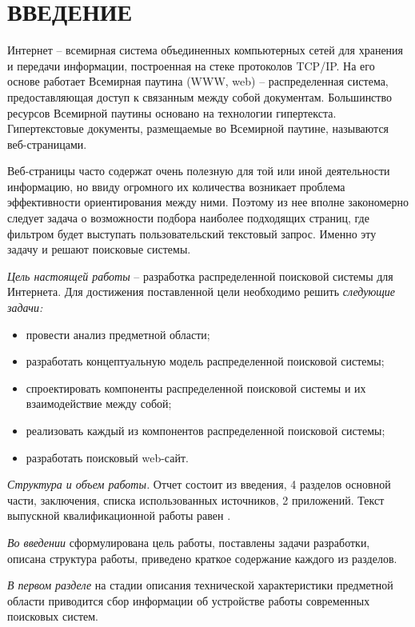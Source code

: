 \section*{ВВЕДЕНИЕ}

Интернет -- всемирная система объединенных компьютерных сетей для хранения и передачи информации, построенная на стеке протоколов TCP/IP. На его основе работает Всемирная паутина (WWW,  web) -- распределенная система, предоставляющая доступ к связанным между собой документам.  Большинство ресурсов Всемирной паутины основано на технологии гипертекста. Гипертекстовые документы, размещаемые во Всемирной паутине, называются веб-страницами.

Веб-страницы часто содержат очень полезную для той или иной деятельности информацию, но ввиду огромного их количества возникает проблема эффективности ориентирования между ними. Поэтому из нее вполне закономерно следует задача о возможности подбора наиболее подходящих страниц, где фильтром будет выступать пользовательский текстовый запрос. Именно эту задачу и решают поисковые системы.

\emph{Цель настоящей работы} – разработка распределенной поисковой системы для Интернета. Для достижения поставленной цели необходимо решить \emph{следующие задачи:}
\begin{itemize}
\item провести анализ предметной области;
\item разработать концептуальную модель распределенной поисковой системы;
\item спроектировать компоненты распределенной поисковой системы и их взаимодействие между собой;
\item реализовать каждый из компонентов распределенной поисковой системы;
\item разработать поисковый web-сайт.
\end{itemize}

\emph{Структура и объем работы.} Отчет состоит из введения, 4 разделов основной части, заключения, списка использованных источников, 2 приложений. Текст выпускной квалификационной работы равен .

\emph{Во введении} сформулирована цель работы, поставлены задачи разработки, описана структура работы, приведено краткое содержание каждого из разделов.

\emph{В первом разделе} на стадии описания технической характеристики предметной области приводится сбор информации об устройстве работы современных поисковых систем.

